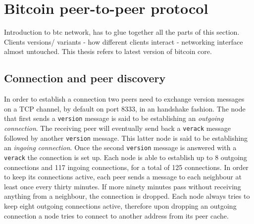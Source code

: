 \documentclass[12pt, letterpaper, twoside]{article}
\title{}
\author{}
\begin{document}
\maketitle

\section{Bitcoin peer-to-peer protocol}
Introduction to btc network, has to glue together all the parts of this section. Clients versions/ variants - how different clients interact - networking interface almost untouched. This thesis refers to latest version of bitcoin core.
\subsection{Connection and peer discovery}
In order to establish a connection two peers need to exchange version messages on a TCP channel, by default on port 8333, in an handshake fashion. The node that first sends a \texttt{version} message is said to be establishing an \emph{outgoing connection}. The receiving peer will eventually send back a \texttt{verack} message followed by another \texttt{version} message. This latter node is said to be establishing an \emph{ingoing connection}. Once the second \texttt{version} message is answered with a \texttt{verack} the connection is set up. Each node is able to establish up to 8 outgoing connections and 117 ingoing connections, for a total of 125 connections. In order to keep its connections active, each peer sends a message to each neighbour at least once every thirty minutes. If more ninety minutes pass without receiving anything from a neighbour, the connection is dropped. Each node always tries to keep eight outgoing connections active, therefore upon dropping an outgoing connection a node tries to connect to another address from its peer cache.\\
\end{document}
